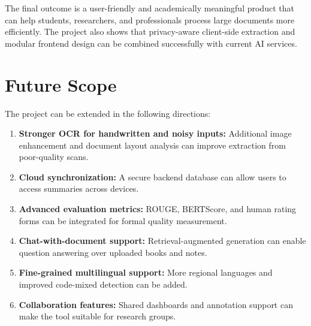 \documentclass[12pt, a4paper]{report}
\begin{document}
The final outcome is a user-friendly and academically meaningful product that can help students, researchers, and professionals process large documents more efficiently. The project also shows that privacy-aware client-side extraction and modular frontend design can be combined successfully with current AI services.

\section{Future Scope}
The project can be extended in the following directions:
\begin{enumerate}
  \item \textbf{Stronger OCR for handwritten and noisy inputs:} Additional image enhancement and document layout analysis can improve extraction from poor-quality scans.
  \item \textbf{Cloud synchronization:} A secure backend database can allow users to access summaries across devices.
  \item \textbf{Advanced evaluation metrics:} ROUGE, BERTScore, and human rating forms can be integrated for formal quality measurement.
  \item \textbf{Chat-with-document support:} Retrieval-augmented generation can enable question answering over uploaded books and notes.
  \item \textbf{Fine-grained multilingual support:} More regional languages and improved code-mixed detection can be added.
  \item \textbf{Collaboration features:} Shared dashboards and annotation support can make the tool suitable for research groups.
\end{enumerate}
\end{document}
